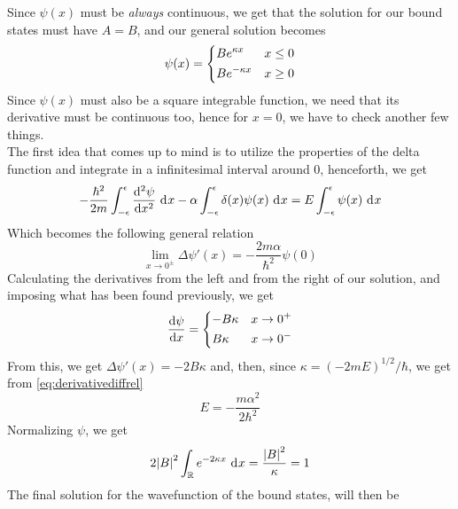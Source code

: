 \documentclass[../qm.tex]{subfiles}
\begin{document}
	Since $\psi(x)$ must be \emph{always} continuous, we get that the solution for our bound states must have $A=B$, and our general solution becomes
	\begin{equation}
		\psi(x)=\begin{dcases}
			Be^{\kappa x}&x\le0\\
			Be^{-\kappa x}&x\ge0
		\end{dcases}
		\label{eq:gensoldeltapotbound}
	\end{equation}
	Since $\psi(x)$ must also be a square integrable function, we need that its derivative must be continuous too, hence for $x=0$, we have to check another few things.\\
	The first idea that comes up to mind is to utilize the properties of the delta function and integrate in a infinitesimal interval around $0$, henceforth, we get
	\begin{equation}
			-\frac{\hbar^2}{2m}\int_{-\epsilon}^{\epsilon}\derivative[2]{\psi}{x}\diff{x}-\alpha\int_{-\epsilon}^{\epsilon}\delta(x)\psi(x)\diff{x}=E\int_{-\epsilon}^{\epsilon}\psi(x)\diff{x}\\
		\label{eq:continuityderdeltapot}
	\end{equation}
	Which becomes the following general relation
	\begin{equation}
		\lim_{x\to0^{\pm}}\Delta\psi'(x)=-\frac{2m\alpha}{\hbar^2}\psi(0)
		\label{eq:derivativediffrel}
	\end{equation}
	Calculating the derivatives from the left and from the right of our solution, and imposing what has been found previously, we get
	\begin{equation}
		\derivative{\psi}{x}=\begin{dcases}
			-B\kappa&x\to0^{+}\\
			B\kappa&x\to0^{-}
		\end{dcases}
		\label{eq:derpsideltapot}
	\end{equation}
	From this, we get $\Delta\psi'(x)=-2B\kappa$ and, then, since $\kappa=(-2mE)^{1/2}/\hbar$, we get from \eqref{eq:derivativediffrel}
	\begin{equation}
		E=-\frac{m\alpha^2}{2\hbar^2}
		\label{eq:boundstatedelta}
	\end{equation}
	Normalizing $\psi$, we get
	\begin{equation}
		2\abs{B}^2\int_{\mathbb{R}}e^{-2\kappa x}\ \mathrm{d}^{}x=\frac{\abs{B}^2}{\kappa}=1
		\label{eq:normdiracdelta}
	\end{equation}
	The final solution for the wavefunction of the bound states, will then be
\end{document}
